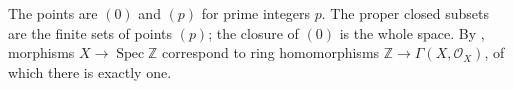 The points are $(0)$ and $(p)$ for prime integers $p$. The proper closed subsets are the finite sets of points $(p)$; the closure of $(0)$ is the whole space. By , morphisms $X\to\operatorname{Spec}\mathbb Z$ correspond to ring homomorphisms $\mathbb Z\to\Gamma(X,\mathcal O_X)$, of which there is exactly one.
